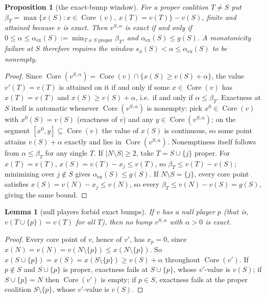 \documentclass[11pt]{article}
\newtheorem{lemma}[theorem]{Lemma}
\newtheorem{proposition}[theorem]{Proposition}
\newcommand{\core}{\operatorname{Core}}
\begin{document}
\begin{proposition}[the exact-bump window]\label{mono:prop:window}
For a proper coalition $T\ne S$ put
$\beta_T=\max\{x(S):x\in\core(v),\ x(T)=v(T)\}-v(S)$, finite and attained
because $v$ is exact.  Then $v^{S,\alpha}$ is exact if and only if
$0\le\alpha\le\alpha_{\mathrm{ex}}(S):=\min_{T\ne S\text{ proper}}\beta_T$,
and $\alpha_{\mathrm{ex}}(S)\le g(S)$.  A monotonicity failure at $S$
therefore requires the window
$s_\phi(S)<\alpha\le\alpha_{\mathrm{ex}}(S)$ to be nonempty.
\end{proposition}

\begin{proof}
Since $\core(v^{S,\alpha})=\core(v)\cap\{x(S)\ge v(S)+\alpha\}$, the value
$v'(T)=v(T)$ is attained on it if and only if some $x\in\core(v)$ has
$x(T)=v(T)$ and $x(S)\ge v(S)+\alpha$, i.e.\ if and only if
$\alpha\le\beta_T$.  Exactness at $S$ itself is automatic whenever
$\core(v^{S,\alpha})$ is nonempty: pick $x^0\in\core(v)$ with $x^0(S)=v(S)$
(exactness of $v$) and any $y\in\core(v^{S,\alpha})$; on the segment
$[x^0,y]\subseteq\core(v)$ the value of $x(S)$ is continuous, so some point
attains $v(S)+\alpha$ exactly and lies in $\core(v^{S,\alpha})$.
Nonemptiness itself follows from $\alpha\le\beta_T$ for any single $T$.
If $|N\setminus S|\ge2$, take $T=S\cup\{j\}$ proper. For $x(T)=v(T)$,
$x(S)=v(T)-x_j\le v(T)$, so $\beta_T\le v(T)-v(S)$; minimizing over
$j\notin S$ gives $\alpha_{\mathrm{ex}}(S)\le g(S)$.
If $N\setminus S=\{j\}$, every core point satisfies $x(S)=v(N)-x_j\le v(N)$,
so every $\beta_T\le v(N)-v(S)=g(S)$, giving the same bound.
\end{proof}

\begin{lemma}[null players forbid exact bumps]\label{mono:lem:null}
If $v$ has a null player $p$ (that is, $v(T\cup\{p\})=v(T)$ for all $T$),
then no bump $v^{S,\alpha}$ with $\alpha>0$ is exact.
\end{lemma}

\begin{proof}
Every core point of $v$, hence of $v'$, has $x_p=0$, since
$x(N)=v(N)=v(N\setminus\{p\})\le x(N\setminus\{p\})$.  So
$x(S\cup\{p\})=x(S)=x(S\setminus\{p\})\ge v(S)+\alpha$ throughout
$\core(v')$.  If $p\notin S$ and $S\cup\{p\}$ is proper, exactness fails at
$S\cup\{p\}$, whose $v'$-value is $v(S)$; if $S\cup\{p\}=N$ then
$\core(v')$ is empty; if $p\in S$, exactness fails at the proper coalition
$S\setminus\{p\}$, whose $v'$-value is $v(S)$.
\end{proof}
\end{document}
